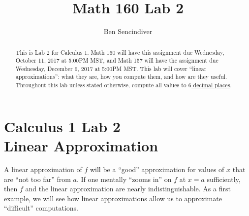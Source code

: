 \documentclass[handout,nooutcomes]{ximera}
\title{Math 160 Lab 2}
\author{Ben Sencindiver} %
\begin{document}
\section{Calculus 1 Lab 2 \\ Linear Approximation}

\begin{abstract}
This is Lab 2 for Calculus 1. Math 160 will have this assignment due Wednesday, October 11, 2017 at 5:00PM MST, and Math 157 will have the assignment due Wednesday, December 6, 2017  at 5:00PM MST.
This lab will cover ``linear approximations'': what they are,
how you compute them, and how are they useful.\\

Throughout this lab unless stated otherwise, compute all values to \underline{$6$ decimal places}.
\end{abstract}

\maketitle


A linear approximation of $f$ will be a ``good'' approximation for values of
$x$ that are ``not too far'' from $a$.
If one mentally ``zooms in'' on $f$ at $x=a$ sufficiently, then $f$ and the linear
approximation are nearly indistinguishable. As a first example, we
will see how linear approximations allow us to approximate
``difficult'' computations.
\end{document}
